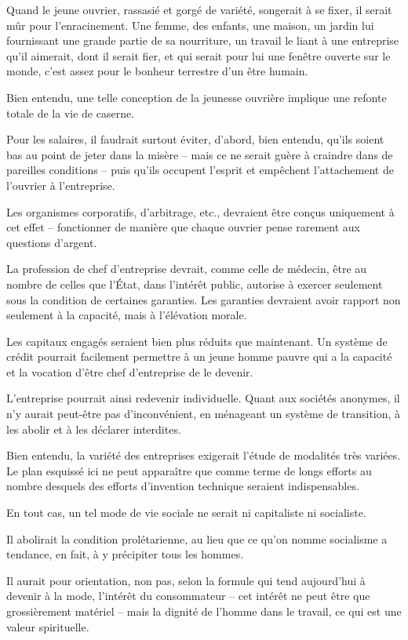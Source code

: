\documentclass[french,twoside]{book} %
\begin{document}
Quand le jeune ouvrier, rassasié et gorgé de variété, songerait à se fixer, il serait mûr pour l'enracinement. Une femme, des enfants, une maison, un jardin lui fournissant une grande partie de sa nourriture, un travail le liant à une entreprise qu'il aimerait, dont il serait fier, et qui serait pour lui une fenêtre ouverte sur le monde, c'est assez pour le bonheur terrestre d'un être humain.\par
Bien entendu, une telle conception de la jeunesse ouvrière implique une refonte totale de la vie de caserne.\par
Pour les salaires, il faudrait surtout éviter, d'abord, bien entendu, qu'ils soient bas au point de jeter dans la misère – mais ce ne serait guère à craindre dans de pareilles conditions – puis qu'ils occupent l'esprit et empêchent l'attachement de l'ouvrier à l'entreprise.\par
Les organismes corporatifs, d'arbitrage, etc., devraient être conçus uniquement à cet effet – fonctionner de manière que chaque ouvrier pense rarement aux questions d'argent.\par
La profession de chef d'entreprise devrait, comme celle de médecin, être au nombre de celles que l'État, dans l'intérêt public, autorise à exercer seulement sous la condition de certaines garanties. Les garanties devraient avoir rapport non seulement à la capacité, mais à l'élévation morale.\par
Les capitaux engagés seraient bien plus réduits que maintenant. Un système de crédit pourrait facilement permettre à un jeune homme pauvre qui a la capacité et la vocation d'être chef d'entreprise de le devenir.\par
L'entreprise pourrait ainsi redevenir individuelle. Quant aux sociétés anonymes, il n'y aurait peut-être pas d'inconvénient, en ménageant un système de transition, à les abolir et à les déclarer interdites.\par
Bien entendu, la variété des entreprises exigerait l'étude de modalités très variées. Le plan esquissé ici ne peut apparaître que comme terme de longs efforts au nombre desquels des efforts d'invention technique seraient indispensables.\par
En tout cas, un tel mode de vie sociale ne serait ni capitaliste ni socialiste.\par
Il abolirait la condition prolétarienne, au lieu que ce qu'on nomme socialisme a tendance, en fait, à y précipiter tous les hommes.\par
Il aurait pour orientation, non pas, selon la formule qui tend aujourd'hui à devenir à la mode, l'intérêt du consommateur – cet intérêt ne peut être que grossièrement matériel – mais la dignité de l'homme dans le travail, ce qui est une valeur spirituelle.\par
\end{document}
